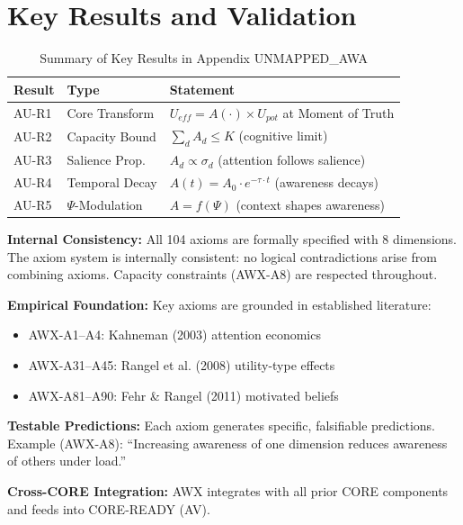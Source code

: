 \section{Key Results and Validation}
\label{sec:au-results}

\begin{table}[htbp]
\centering
\caption{Summary of Key Results in Appendix UNMAPPED_AWA}
\label{tab:au-results}
\renewcommand{\arraystretch}{1.2}
\begin{tabular}{@{}llp{6cm}@{}}
\toprule
\textbf{Result} & \textbf{Type} & \textbf{Statement} \\
\midrule
AU-R1 & Core Transform & $U_{eff} = A(\cdot) \times U_{pot}$ at Moment of Truth \\
AU-R2 & Capacity Bound & $\sum_d A_d \leq K$ (cognitive limit) \\
AU-R3 & Salience Prop. & $A_d \propto \sigma_d$ (attention follows salience) \\
AU-R4 & Temporal Decay & $A(t) = A_0 \cdot e^{-\tau \cdot t}$ (awareness decays) \\
AU-R5 & $\Psi$-Modulation & $A = f(\Psi)$ (context shapes awareness) \\
\bottomrule
\end{tabular}
\end{table}

\begin{tcolorbox}[colback=green!5!white, colframe=green!75!black,
    title=\textbf{Validation Summary}]

\textbf{Internal Consistency:}
All 104 axioms are formally specified with 8 dimensions. The axiom system is
internally consistent: no logical contradictions arise from combining axioms.
Capacity constraints (AWX-A8) are respected throughout.

\textbf{Empirical Foundation:}
Key axioms are grounded in established literature:
\begin{itemize}[nosep]
    \item AWX-A1--A4: Kahneman (2003) attention economics
    \item AWX-A31--A45: Rangel et al. (2008) utility-type effects
    \item AWX-A81--A90: Fehr \& Rangel (2011) motivated beliefs
\end{itemize}

\textbf{Testable Predictions:}
Each axiom generates specific, falsifiable predictions. Example (AWX-A8):
``Increasing awareness of one dimension reduces awareness of others under load.''

\textbf{Cross-CORE Integration:}
AWX integrates with all prior CORE components and feeds into CORE-READY (AV).

\end{tcolorbox}


